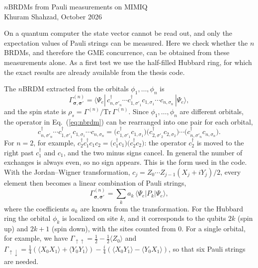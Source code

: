 \documentclass[11pt,a4paper]{article}
\begin{document}
\begin{center}
{\large $n$BRDMs from Pauli measurements on MIMIQ}\\[4pt]
Khuram Shahzad, October 2026
\end{center}

On a quantum computer the state vector cannot be read out, and only the
expectation values of Pauli strings can be measured. Here we check whether the
$n$BRDMs, and therefore the GME concurrence, can be obtained from these
measurements alone. As a first test we use the half-filled Hubbard ring, for
which the exact results are already available from the thesis code.

The $n$BRDM extracted from the orbitals $\phi_1,\dots,\phi_n$ is
\begin{equation}\label{eq:nbrdm}
  \Gamma^{(n)}_{\boldsymbol{\sigma},\boldsymbol{\sigma}'} =
  \langle \Psi_e |\, c^\dagger_{n,\sigma'_n} \cdots c^\dagger_{1,\sigma'_1}
  c_{1,\sigma_1} \cdots c_{n,\sigma_n} \,| \Psi_e \rangle ,
\end{equation}
and the spin state is $\rho_s = \Gamma^{(n)}/\mathrm{Tr}\,\Gamma^{(n)}$.
Since $\phi_1,\dots,\phi_n$ are different orbitals, the operator in
Eq.~(\ref{eq:nbrdm}) can be rearranged into one pair for each orbital,
\begin{equation}\label{eq:pairs}
  c^\dagger_{n,\sigma'_n} \cdots c^\dagger_{1,\sigma'_1}
  c_{1,\sigma_1} \cdots c_{n,\sigma_n}
  = \big( c^\dagger_{1,\sigma'_1} c_{1,\sigma_1} \big)
    \big( c^\dagger_{2,\sigma'_2} c_{2,\sigma_2} \big) \cdots
    \big( c^\dagger_{n,\sigma'_n} c_{n,\sigma_n} \big) .
\end{equation}
For $n = 2$, for example,
$c^\dagger_{2} c^\dagger_{1} c_{1} c_{2} = \big(c^\dagger_{1} c_{1}\big)\big(c^\dagger_{2} c_{2}\big)$:
the operator $c^\dagger_{2}$ is moved to the right past $c^\dagger_{1}$ and
$c_{1}$, and the two minus signs cancel. In general the number of exchanges is
always even, so no sign appears. This is the form used in the code. With
the Jordan--Wigner transformation,
$c_j = Z_0 \cdots Z_{j-1} (X_j + iY_j)/2$, every element then becomes a linear
combination of Pauli strings,
\begin{equation}\label{eq:pauli}
  \Gamma^{(n)}_{\boldsymbol{\sigma},\boldsymbol{\sigma}'}
  = \sum_k a_k \, \langle \Psi_e | P_k | \Psi_e \rangle ,
\end{equation}
where the coefficients $a_k$ are known from the transformation. For the Hubbard
ring the orbital $\phi_k$ is localized on site $k$, and it corresponds to the
qubits $2k$ (spin up) and $2k+1$ (spin down), with the sites counted from 0.
For a single orbital, for example, we have
$\Gamma_{\uparrow\uparrow} = \tfrac{1}{2} - \tfrac{1}{2}\langle Z_0 \rangle$ and
$\Gamma_{\uparrow\downarrow} = \tfrac{1}{4}(\langle X_0X_1\rangle + \langle Y_0Y_1\rangle)
- \tfrac{i}{4}(\langle X_0Y_1\rangle - \langle Y_0X_1\rangle)$, so that six
Pauli strings are needed.
\end{document}
